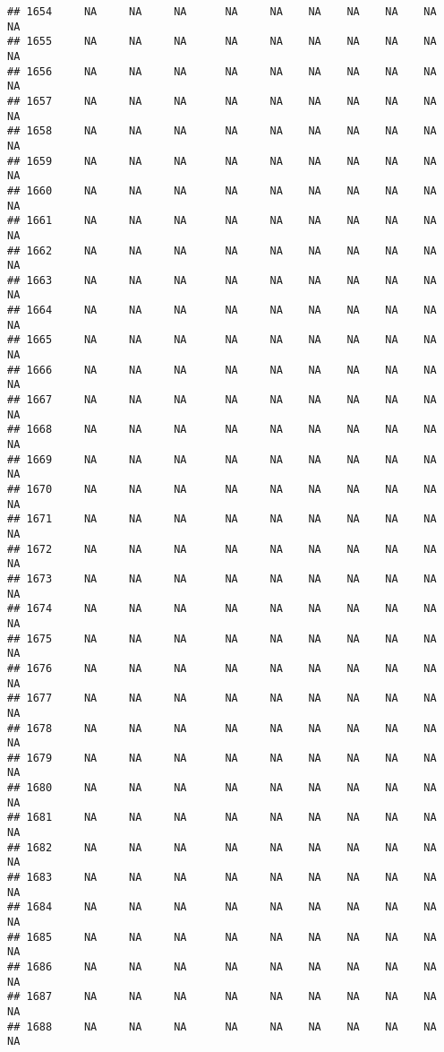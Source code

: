\documentclass{article}\usepackage{graphicx, color}
\makeatletter
\newenvironment{kframe}{%
 \def\at@end@of@kframe{}%
 \ifinner\ifhmode%
  \def\at@end@of@kframe{\end{minipage}}%
  \begin{minipage}{\columnwidth}%
 \fi\fi%
 \def\FrameCommand##1{\hskip\@totalleftmargin \hskip-\fboxsep
 \colorbox{shadecolor}{##1}\hskip-\fboxsep
     \hskip-\linewidth \hskip-\@totalleftmargin \hskip\columnwidth}%
 \MakeFramed {\advance\hsize-\width
   \@totalleftmargin\z@ \linewidth\hsize
   \@setminipage}}%
 {\par\unskip\endMakeFramed%
 \at@end@of@kframe}
\newenvironment{knitrout}{}{} %
\makeatother
\begin{document}
\begin{knitrout}
\begin{kframe}
\begin{verbatim}
## 1654     NA     NA     NA      NA     NA    NA    NA    NA    NA     NA
## 1655     NA     NA     NA      NA     NA    NA    NA    NA    NA     NA
## 1656     NA     NA     NA      NA     NA    NA    NA    NA    NA     NA
## 1657     NA     NA     NA      NA     NA    NA    NA    NA    NA     NA
## 1658     NA     NA     NA      NA     NA    NA    NA    NA    NA     NA
## 1659     NA     NA     NA      NA     NA    NA    NA    NA    NA     NA
## 1660     NA     NA     NA      NA     NA    NA    NA    NA    NA     NA
## 1661     NA     NA     NA      NA     NA    NA    NA    NA    NA     NA
## 1662     NA     NA     NA      NA     NA    NA    NA    NA    NA     NA
## 1663     NA     NA     NA      NA     NA    NA    NA    NA    NA     NA
## 1664     NA     NA     NA      NA     NA    NA    NA    NA    NA     NA
## 1665     NA     NA     NA      NA     NA    NA    NA    NA    NA     NA
## 1666     NA     NA     NA      NA     NA    NA    NA    NA    NA     NA
## 1667     NA     NA     NA      NA     NA    NA    NA    NA    NA     NA
## 1668     NA     NA     NA      NA     NA    NA    NA    NA    NA     NA
## 1669     NA     NA     NA      NA     NA    NA    NA    NA    NA     NA
## 1670     NA     NA     NA      NA     NA    NA    NA    NA    NA     NA
## 1671     NA     NA     NA      NA     NA    NA    NA    NA    NA     NA
## 1672     NA     NA     NA      NA     NA    NA    NA    NA    NA     NA
## 1673     NA     NA     NA      NA     NA    NA    NA    NA    NA     NA
## 1674     NA     NA     NA      NA     NA    NA    NA    NA    NA     NA
## 1675     NA     NA     NA      NA     NA    NA    NA    NA    NA     NA
## 1676     NA     NA     NA      NA     NA    NA    NA    NA    NA     NA
## 1677     NA     NA     NA      NA     NA    NA    NA    NA    NA     NA
## 1678     NA     NA     NA      NA     NA    NA    NA    NA    NA     NA
## 1679     NA     NA     NA      NA     NA    NA    NA    NA    NA     NA
## 1680     NA     NA     NA      NA     NA    NA    NA    NA    NA     NA
## 1681     NA     NA     NA      NA     NA    NA    NA    NA    NA     NA
## 1682     NA     NA     NA      NA     NA    NA    NA    NA    NA     NA
## 1683     NA     NA     NA      NA     NA    NA    NA    NA    NA     NA
## 1684     NA     NA     NA      NA     NA    NA    NA    NA    NA     NA
## 1685     NA     NA     NA      NA     NA    NA    NA    NA    NA     NA
## 1686     NA     NA     NA      NA     NA    NA    NA    NA    NA     NA
## 1687     NA     NA     NA      NA     NA    NA    NA    NA    NA     NA
## 1688     NA     NA     NA      NA     NA    NA    NA    NA    NA     NA

\end{verbatim}
\end{kframe}
\end{knitrout}
\end{document}
